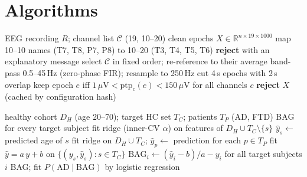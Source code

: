\documentclass[conference]{IEEEtran}
\begin{document}
\section{Algorithms}

\begin{algorithm}[t]
\caption{Harmonized preprocessing}
\label{alg:pre}
\begin{algorithmic}[1]
\Require EEG recording $R$; channel list $\mathcal{C}$ (19, 10--20)
\Ensure clean epochs $X \in \mathbb{R}^{n\times19\times1000}$
\State map 10--10 names (T7, T8, P7, P8) to 10--20 (T3, T4, T5, T6)
 \State \textbf{reject} with an explanatory message \EndIf
\State select $\mathcal{C}$ in fixed order; re-reference to their average
\State band-pass 0.5--45\,Hz (zero-phase FIR); resample to 250\,Hz
\State cut 4\,s epochs with 2\,s overlap
\State keep epoch $e$ iff $1\,\mu\mathrm{V} < \mathrm{ptp}_c(e) < 150\,\mu\mathrm{V}$ for all channels $c$
 \State \textbf{reject} \EndIf
\State \Return $X$ (cached by configuration hash)
\end{algorithmic}
\end{algorithm}

\begin{algorithm}[t]
\caption{Brain-age training, transfer and BAG}
\label{alg:ba}
\begin{algorithmic}[1]
\Require healthy cohort $D_H$ (age 20--70); target HC set $T_C$; patients $T_P$ (AD, FTD)
\Ensure BAG for every target subject
 
  \State fit ridge (inner-CV $\alpha$) on features of $D_H \cup T_C\setminus\{s\}$
  \State $\hat{y}_s \gets$ predicted age of $s$
\EndFor
\State fit ridge on $D_H \cup T_C$; $\hat{y}_p \gets$ prediction for each $p \in T_P$
\State fit $\hat{y} = a\,y + b$ on $\{(y_s,\hat{y}_s): s\in T_C\}$ 
\State $\mathrm{BAG}_i \gets (\hat{y}_i - b)/a - y_i$ for all target subjects $i$
\State \Return BAG; fit $P(\mathrm{AD}\mid\mathrm{BAG})$ by logistic regression
\end{algorithmic}
\end{algorithm}
\end{document}
